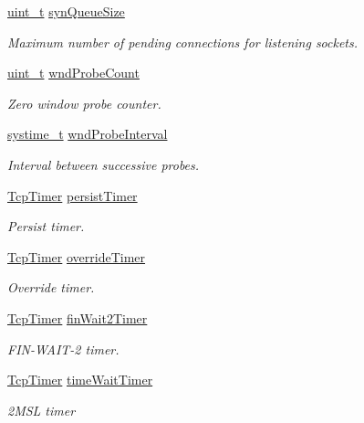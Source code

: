 \begin{DoxyCompactItemize}
\hyperlink{compiler__port_8h_a12a1e9b3ce141648783a82445d02b58d}{uint\+\_\+t} \hyperlink{struct__Socket_a2659006107e539262135066dfb8d5bd8}{syn\+Queue\+Size}
\begin{DoxyCompactList}\small\item\em Maximum number of pending connections for listening sockets. \end{DoxyCompactList}\item 
\hyperlink{compiler__port_8h_a12a1e9b3ce141648783a82445d02b58d}{uint\+\_\+t} \hyperlink{struct__Socket_a5f808c6b2f83f5129178409566dabcb1}{wnd\+Probe\+Count}
\begin{DoxyCompactList}\small\item\em Zero window probe counter. \end{DoxyCompactList}\item 
\hyperlink{compiler__port_8h_ae3e32a98d431a02106616da3071832dd}{systime\+\_\+t} \hyperlink{struct__Socket_af6d14811d5d3fbdee734d5f4ab17d5ac}{wnd\+Probe\+Interval}
\begin{DoxyCompactList}\small\item\em Interval between successive probes. \end{DoxyCompactList}\item 
\hyperlink{structTcpTimer}{Tcp\+Timer} \hyperlink{struct__Socket_a621c94b77ad3f7718bec14fde138ffab}{persist\+Timer}
\begin{DoxyCompactList}\small\item\em Persist timer. \end{DoxyCompactList}\item 
\hyperlink{structTcpTimer}{Tcp\+Timer} \hyperlink{struct__Socket_ade20a8ca035328791d5370d8ade55832}{override\+Timer}
\begin{DoxyCompactList}\small\item\em Override timer. \end{DoxyCompactList}\item 
\hyperlink{structTcpTimer}{Tcp\+Timer} \hyperlink{struct__Socket_ab612f7ddcc903a2872649ea0b7eddc3d}{fin\+Wait2\+Timer}
\begin{DoxyCompactList}\small\item\em F\+I\+N-\/\+W\+A\+I\+T-\/2 timer. \end{DoxyCompactList}\item 
\hyperlink{structTcpTimer}{Tcp\+Timer} \hyperlink{struct__Socket_a83c1b62649de205f0e9be9798e721378}{time\+Wait\+Timer}
\begin{DoxyCompactList}\small\item\em 2\+M\+SL timer \end{DoxyCompactList}\item 

\end{DoxyCompactItemize}
